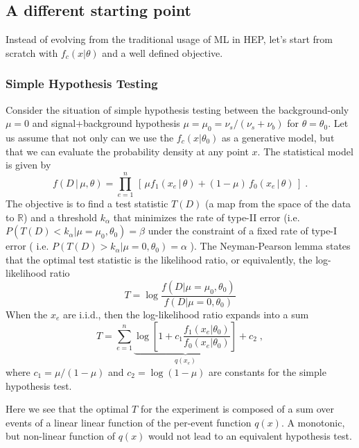 \documentclass[11pt, oneside]{article}   	%
\begin{document}
\subsection{A different starting point}

Instead of evolving from the traditional usage of ML in HEP, let's start from scratch with $f_c(x|\theta)$ and a well defined objective.  

\subsubsection{Simple Hypothesis Testing}

Consider the situation of simple hypothesis testing between the background-only $\mu=0$ and signal+background hypothesis $\mu=\mu_0=\nu_s/(\nu_s+\nu_b)$ for $\theta=\theta_0$.  Let us assume that not only can we use the $f_c(x|\theta_0)$ as a generative model, but that we can evaluate the probability density at any point $x$.  The statistical model is given by
\begin{equation}\label{eq:NP}
f( D \,|\, \mu, \theta) = \prod_{e=1}^n \, \left[\, \mu f_1( x_e \, |\,  \theta)  + (1-\mu)\, f_0( x_e \,|\, \theta) \,\right] \; .
\end{equation}
The objective is to find a  test statistic $T(D)$ (a map from the space of the data to $\mathbb{R}$)  
and a threshold $k_\alpha$ that minimizes the rate of type-II error (i.e. $P(T(D) < k_\alpha | \mu=\mu_0, \theta_0) = \beta$ under the constraint of a fixed rate of type-I error ( i.e.  $P(T(D) > k_\alpha | \mu=0, \theta_0) = \alpha$ ).
The Neyman-Pearson lemma states that the optimal test statistic is the likelihood ratio, or equivalently, the log-likelihood ratio 
\begin{equation}
T =  \log \frac{f(D | \mu=\mu_0, \theta_0)}{f(D | \mu=0, \theta_0)}
\end{equation}
When the $x_e$ are i.i.d., then the log-likelihood ratio expands into a sum
\begin{equation}
T =   \sum_{e=1}^n \underbrace{\log \left[ 1+c_1\frac {f_1(x_e | \theta_0) }{ f_0(x_e | \theta_0) } \right]}_{q(x_e)} + c_2\;,
\end{equation}
where $c_1=\mu/(1-\mu)$ and $c_2=\log(1-\mu)$ are constants for the simple hypothesis test.

Here we see that the optimal $T$ for the experiment is composed of a sum over events of a linear linear function of the per-event function $q(x)$. A monotonic, but non-linear function of $q(x)$ would not lead to an equivalent hypothesis test. 
\end{document}

